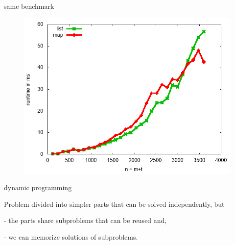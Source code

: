 \begin{frame}{same benchmark}

\begin{figure}
 \includegraphics[scale=0.5]{note.png}
\end{figure}

\end{frame}


\begin{frame}{dynamic programming}

\vspace{40pt}\hspace{80pt}\parbox[l][60pt][l]{240pt}{Problem divided into simpler parts that can be solved independently, but

\vspace{10pt}\pause
-  the parts share subproblems that can be reused and,

\vspace{10pt}\pause
-  we can memorize solutions of subproblems.
}



\end{frame}



